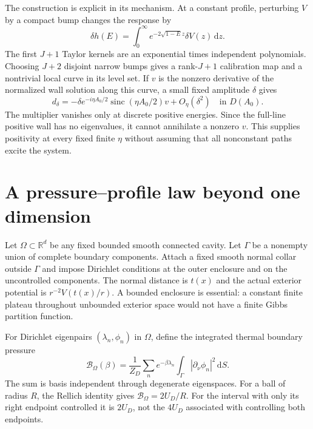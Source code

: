 \documentclass[aps,pra,reprint,superscriptaddress,longbibliography]{revtex4-2}
\newcommand{\dd}{\mathrm d}
\newcommand{\calB}{\mathcal B}
\newcommand{\R}{\mathbb R}
\newcommand{\sinc}{\operatorname{sinc}}
\begin{document}
The construction is explicit in its mechanism. At a constant profile, perturbing $V$ by a compact bump changes the response by
\begin{equation}
 \delta h(E)=\int_0^\infty e^{-2\sqrt{1-E}z}\delta V(z)\,\dd z.
 \label{eq:variationh}
\end{equation}
The first $J+1$ Taylor kernels are an exponential times independent polynomials. Choosing $J+2$ disjoint narrow bumps gives a rank-$J+1$ calibration map and a nontrivial local curve in its level set. If $v$ is the nonzero derivative of the normalized wall solution along this curve, a small fixed amplitude $\delta$ gives
\begin{equation}
 d_\delta=-\delta e^{-i\eta A_0/2}\sinc(\eta A_0/2)v
                      +O_\eta(\delta^2)\quad\text{in }D(A_0).
 \label{eq:filter}
\end{equation}
The multiplier vanishes only at discrete positive energies. Since the full-line positive wall has no eigenvalues, it cannot annihilate a nonzero $v$. This supplies positivity at every fixed finite $\eta$ without assuming that all nonconstant paths excite the system.

\section{A pressure--profile law beyond one dimension}

Let $\Omega\subset\R^d$ be any fixed bounded smooth connected cavity. Let $\Gamma$ be a nonempty union of complete boundary components. Attach a fixed smooth normal collar outside $\Gamma$ and impose Dirichlet conditions at the outer enclosure and on the uncontrolled components. The normal distance is $t(x)$ and the actual exterior potential is $r^{-2}V(t(x)/r)$. A bounded enclosure is essential: a constant finite plateau throughout unbounded exterior space would not have a finite Gibbs partition function.

For Dirichlet eigenpairs $(\lambda_n,\phi_n)$ in $\Omega$, define the integrated thermal boundary pressure
\begin{equation}
 \calB_\Omega(\beta)=\frac1{Z_D}\sum_n e^{-\beta\lambda_n}
             \int_\Gamma |\partial_\nu\phi_n|^2\,\dd S.
 \label{eq:boundarypressure}
\end{equation}
The sum is basis independent through degenerate eigenspaces. For a ball of radius $R$, the Rellich identity gives $\calB_\Omega=2U_D/R$. For the interval with only its right endpoint controlled it is $2U_D$, not the $4U_D$ associated with controlling both endpoints.
\end{document}
